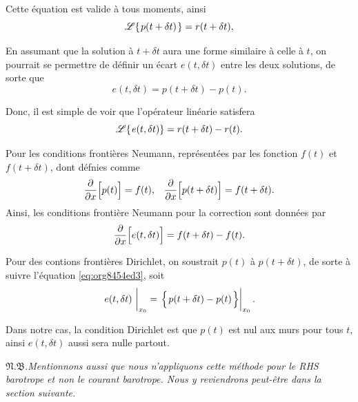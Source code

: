\documentclass[10pt]{article}
\numberwithin{equation}{section}
\newcommand{\tall}{\vphantom{pA^{x^x}_p}}
\newcommand{\pt}{\hspace{1pt}} %
\newcommand{\nb}{\underline{{\footnotesize\EightStarConvex}\pt $\mathfrak{N.B.}$\vphantom{p}}\hspace{3pt}}
\begin{document}
Cette équation est valide à tous moments, ainsi
\begin{equation}
   \mathscr{L}\qty{\pt p(t+\delta t)\pt} = r(t+\delta t),
\end{equation}

En assumant que la solution à \(t+\delta t\) aura une forme similaire à celle à \(t\), on pourrait se permettre de définir un écart \(e(t,\delta t)\) entre les deux solutions, de sorte que
\begin{equation}
\label{eq:org8454ed3}
   e(t,\delta t) = p(t+\delta t) - p(t).
\end{equation}

Donc, il est simple de voir que l'opérateur linéarie satisfera
\begin{equation}
   \mathscr{L}\qty{\pt e(t,\delta t)} = r(t+\delta t) - r(t).
\end{equation}

Pour les conditions frontières Neumann, représentées par les fonction \(f(t)\) et \(f(t+\delta t)\), dont défnies comme
\begin{align}
   && \pdv{}{x} \qty[ \tall p(t) ] = f(t), && \pdv{}{x} \qty[\tall p(t+\delta t)] = f(t+\delta t). &&
\end{align}
Ainsi, les conditions frontière Neumann pour la correction sont données par
\begin{equation}
   \pdv{}{x} \qty[ \tall e(t,\delta t) ]  = f(t+\delta t) - f(t).
\end{equation}

Pour des contions frontières Dirichlet, on soustrait \(p(t)\) à \(p(t+\delta t)\), de sorte à suivre l'équation \ref{eq:org8454ed3}, soit
\begin{equation}
   \eval{e(t,\delta t)\ }_{x_0} = \eval{ \qty{ \pt p(t+\delta t) - p(t)\pt \tall } }_{x_0}.
\end{equation}

Dans notre cas, la condition Dirichlet est que \(p(t)\) est nul aux murs pour tous \(t\), ainsi \(e(t,\delta t)\) aussi sera nulle partout.\bigskip

\nb \emph{Mentionnons aussi que nous n'appliquons cette méthode pour le RHS barotrope et non le courant barotrope. Nous y reviendrons peut-être dans la section suivante.}
\end{document}
